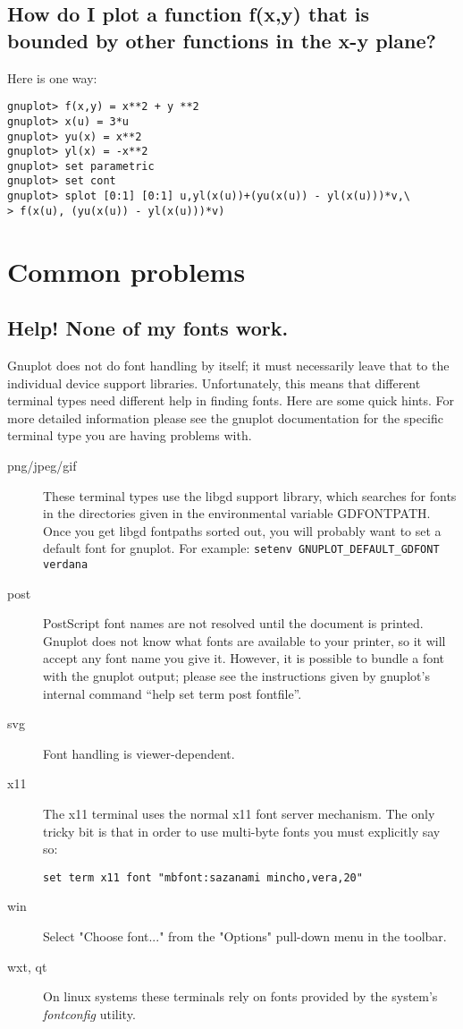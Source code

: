 \documentclass[a4paper,11pt]{article}
\begin{document}
\subsection{How do I plot a function f(x,y) that is bounded by other
          functions in the x-y plane?}

Here is one way:
\small
\begin{verbatim}
gnuplot> f(x,y) = x**2 + y **2
gnuplot> x(u) = 3*u
gnuplot> yu(x) = x**2
gnuplot> yl(x) = -x**2
gnuplot> set parametric
gnuplot> set cont
gnuplot> splot [0:1] [0:1] u,yl(x(u))+(yu(x(u)) - yl(x(u)))*v,\
> f(x(u), (yu(x(u)) - yl(x(u)))*v)
\end{verbatim}
\normalsize


\section{Common problems}


\subsection{Help! None of my fonts work.}

Gnuplot does not do font handling by itself; it must necessarily leave
that to the individual device support libraries. Unfortunately, this
means that different terminal types need different help in finding
fonts. Here are some quick hints. For more detailed information please
see the gnuplot documentation for the specific terminal type you are
having problems with.

\begin{description}
\item [{png/jpeg/gif}] These terminal types use the libgd support library, which
searches for fonts in the directories given in the environmental variable
GDFONTPATH. Once you get libgd fontpaths sorted out, you will probably
want to set a default font for gnuplot.
For example: \verb+setenv GNUPLOT_DEFAULT_GDFONT verdana+
\item [{post}] PostScript font names are not resolved until the document
is printed. Gnuplot does not know what fonts are available to your
printer, so it will accept any font name you give it. However, it
is possible to bundle a font with the gnuplot output; please see the
instructions given by gnuplot's internal command {}``help set term
post fontfile''.
\item [{svg}] Font handling is viewer-dependent. 
\item [{x11}] The x11 terminal uses the normal x11 font server mechanism.
The only tricky bit is that in order to use multi-byte fonts you must
explicitly say so:
\small\begin{verbatim}
set term x11 font "mbfont:sazanami mincho,vera,20"
\end{verbatim}\normalsize
\item [{win}] Select "Choose font..." from the "Options" pull-down menu 
in the toolbar.
\item [{wxt, qt}] On linux systems these terminals rely on fonts provided
by the system's \textit{fontconfig} utility.
\end{description}
\end{document}

